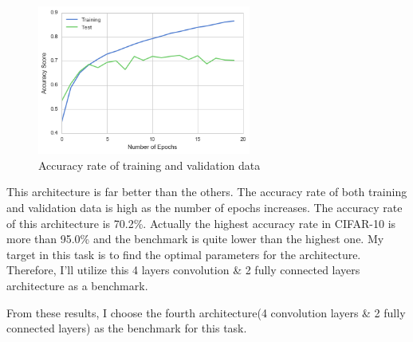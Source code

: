 \begin{enumerate}
\begin{figure}[H]
	\begin{center}
	\includegraphics[width=7cm]{picture/4layer_cnn.png}
	\caption{Accuracy rate of training and validation data}
	\end{center}
	\label{fig:eleven}

\end{figure}
\end{enumerate}


This architecture is far better than the others. The accuracy rate of both training and validation data is high as the number of epochs increases.
The accuracy rate of this architecture is 70.2\%. Actually the highest accuracy rate in CIFAR-10 is more than 95.0\% and the benchmark is quite lower than the highest one. My target in this task is to find the optimal parameters for the architecture. Therefore, I'll utilize this 4 layers convolution \& 2 fully connected layers architecture as a benchmark.


From these results, I choose the fourth architecture(4 convolution layers \& 2 fully connected layers) as the benchmark for this task.
